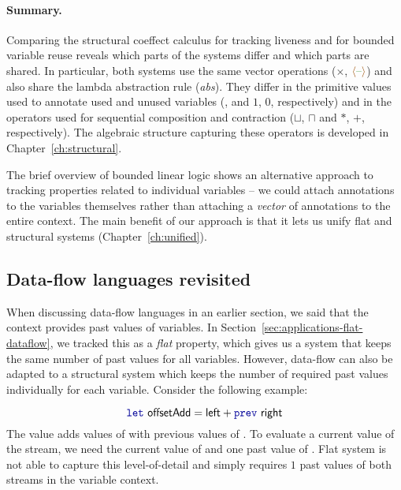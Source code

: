 \paragraph{Summary.}
Comparing the structural coeffect calculus for tracking liveness and for bounded variable reuse
reveals which parts of the systems differ and which parts are shared. In particular, both systems
use the same vector operations ($\times$, $\alift{\cclrd{\textnormal{--}}}$) and also share the
lambda abstraction rule (\emph{abs}). They differ in the primitive values used to annotate used
and unused variables (,  and $1$, $0$, respectively) and in the operators used
for sequential composition and contraction ($\sqcup$, $\sqcap$ and $\ast$, $+$, respectively).
The algebraic structure capturing these operators is developed in Chapter~\ref{ch:structural}.

The brief overview of bounded linear logic shows an alternative approach to tracking properties
related to individual variables -- we could attach annotations to the variables themselves 
rather than attaching a \emph{vector} of annotations to the entire context. The main benefit
of our approach is that it lets us unify flat and structural systems (Chapter~\ref{ch:unified}).


\subsection{Data-flow languages revisited}
\label{sec:applications-structural-dataflow}

When discussing data-flow languages in an earlier section, we said that the context provides 
past values of variables. In Section~\ref{sec:applications-flat-dataflow}, we tracked this as 
a \emph{flat} property, which gives us a system that keeps the same number of past values for
all variables. However, data-flow can also be adapted to a structural system which keeps the number 
of required past values individually for each variable. Consider the 
following example:

\begin{equation*}
\kvd{let}~\ident{offsetAdd} = \ident{left} + \kvd{prev}~\ident{right}
\end{equation*}
%
The value  adds values of  with previous values of .
To evaluate a current value of the stream, we need the current value of  and one past
value of . Flat system is not able to capture this level-of-detail and simply
requires $1$ past values of both streams in the variable context.

